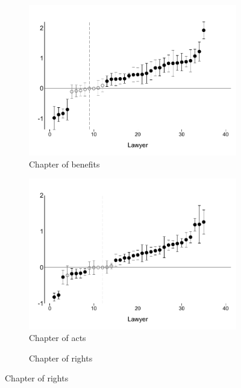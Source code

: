 \documentclass[oneside,11pt]{article}
\begin{document}
\begin{figure}[H]
\begin{center}
\begin{subfigure}{0.49\textwidth}
    \end{subfigure}
    \begin{subfigure}{0.49\textwidth}
        \caption{Chapter of benefits}
        \centering
        \includegraphics[width=\textwidth]{Figuras/betasp3_ql_calif_prestaciones.pdf}
    \end{subfigure}
    \begin{subfigure}{0.49\textwidth}
        \caption{Chapter of acts}
        \centering
        \includegraphics[width=\textwidth]{Figuras/betasp3_ql_calif_hechos.pdf}
    \end{subfigure}    
 \begin{subfigure}{0.49\textwidth}
        \caption{Chapter of rights}
        \centering

\end{subfigure}
\end{center}
\end{figure}
\end{document}
